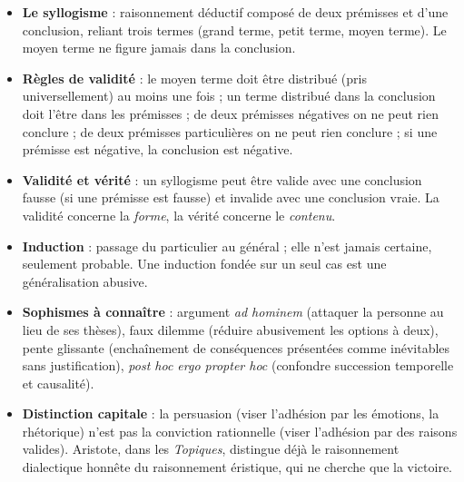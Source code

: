 \documentclass[11pt]{article}
\newcommand{\cle}[1]{{\popxbold\color{popdark}#1}}
\newcounter{popsec}
\newcounter{popsub}
\newcommand{\courssub}[1]{%
  \stepcounter{popsub}%
  \par\vspace{9pt}\noindent{\popxbold\fontsize{11.5}{13}\selectfont\color{popink}{\color{poporange}\thepopsec.\thepopsub}\hspace{6pt}#1}\par\nopagebreak\vspace{4pt}
}
\begin{document}
\begin{aretenir}
\begin{itemize}
\item \textbf{Le syllogisme} : raisonnement déductif composé de deux prémisses et d'une conclusion, reliant trois termes (grand terme, petit terme, moyen terme). Le moyen terme ne figure jamais dans la conclusion.
\item \textbf{Règles de validité} : le moyen terme doit être distribué (pris universellement) au moins une fois ; un terme distribué dans la conclusion doit l'être dans les prémisses ; de deux prémisses négatives on ne peut rien conclure ; de deux prémisses particulières on ne peut rien conclure ; si une prémisse est négative, la conclusion est négative.
\item \textbf{Validité et vérité} : un syllogisme peut être valide avec une conclusion fausse (si une prémisse est fausse) et invalide avec une conclusion vraie. La validité concerne la \emph{forme}, la vérité concerne le \emph{contenu}.
\item \textbf{Induction} : passage du particulier au général ; elle n'est jamais certaine, seulement probable. Une induction fondée sur un seul cas est une \cle{généralisation abusive}.
\item \textbf{Sophismes à connaître} : argument \emph{ad hominem} (attaquer la personne au lieu de ses thèses), faux dilemme (réduire abusivement les options à deux), pente glissante (enchaînement de conséquences présentées comme inévitables sans justification), \emph{post hoc ergo propter hoc} (confondre succession temporelle et causalité).
\item \textbf{Distinction capitale} : la \cle{persuasion} (viser l'adhésion par les émotions, la rhétorique) n'est pas la \cle{conviction} rationnelle (viser l'adhésion par des raisons valides). Aristote, dans les \emph{Topiques}, distingue déjà le raisonnement dialectique honnête du raisonnement éristique, qui ne cherche que la victoire.
\end{itemize}
\end{aretenir}

\courssub{Démarche et corrigé commenté}
\end{document}
